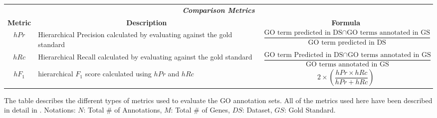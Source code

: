 \begin{landscape}
\begin{table}[h]
\begin{tabularx}{\linewidth}{|cXc|}
\begin{minipage}{4.2in}
    \end{minipage}
    \\
    \hline
    \multicolumn{3}{|c|}{\emph{\textbf{Comparison Metrics}}} \\
    \hline
    \textbf{Metric} & \multicolumn{1}{c}{\textbf{Description}} & \multicolumn{1}{c|}{\textbf{Formula}} \\
    \hline
    $hPr$ & Hierarchical Precision calculated by evaluating against the gold standard &
    \begin{minipage}[c]{4.2in}
      \begin{equation*}
        \frac{
        \text{GO term predicted in DS} \cap \text{GO terms annotated in GS}
        }
        {
          \text{GO term predicted in DS}
        }
      \end{equation*}
    \end{minipage}
    \\
    \hline
    $hRc$ & Hierarchical Recall calculated  by evaluating against the gold standard &
    \begin{minipage}{4.2in}
      \begin{equation*}
        \frac{
        \text{GO term Predicted in DS} \cap \text{GO terms annotated in GS}
        }
        {
          \text{GO terms annotated in GS}
        }
      \end{equation*}
    \end{minipage}

    \\
    \hline
    $hF_1$ &
    hierarchical $F_1$ score calculated using $hPr$ and $hRc$
    &
    \begin{minipage}{4.2in}
    \begin{equation*}
      2 \times \left (
            \frac{
            hPr \times hRc
            }
            {
              hPr + hRc
            }
            \right )
    \end{equation*}
    \end{minipage}
    \\
    \hline
  \end{tabularx}

  \raggedright
  \bigskip
  The table describes the different types of metrics used to evaluate the GO annotation sets. All of the metrics used here have been described in detail in \cite{defoinplatel_2011-rs}. Notations: $N$: Total \# of Annotations, $M$: Total \# of Genes, $DS$: Dataset, $GS$: Gold Standard.
\end{table}
\end{landscape}